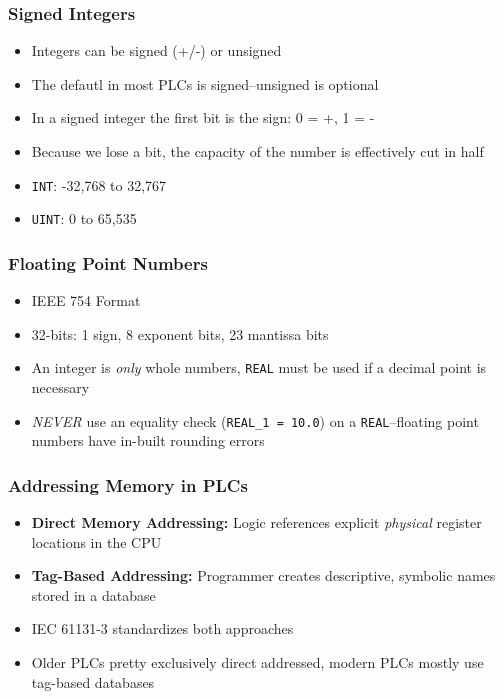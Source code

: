 \begin{frame}
    \frametitle{Signed Integers}
    
    \begin{itemize}
        \item Integers can be signed (+/-) or unsigned
        \item The defautl in most PLCs is signed--unsigned is optional
        \item In a signed integer the first bit is the sign: 0 = +, 1 = -
        \item Because we lose a bit, the capacity of the number is effectively cut in half
        \item \texttt{INT}: -32,768 to 32,767
        \item \texttt{UINT}: 0 to 65,535
    \end{itemize}
\end{frame}

\begin{frame}
    \frametitle{Floating Point Numbers}
    
    \begin{itemize}
        \item IEEE 754 Format
        \item 32-bits: 1 sign, 8 exponent bits, 23 mantissa bits
        \item An integer is \emph{only} whole numbers, \texttt{REAL} must be used if a decimal point is necessary
        \item \emph{NEVER} use an equality check (\texttt{REAL\_1 = 10.0}) on a \texttt{REAL}--floating point numbers have in-built rounding errors
    \end{itemize}
\end{frame}

\begin{frame}
    \frametitle{Addressing Memory in PLCs}

    \begin{itemize}
        \item \textbf{Direct Memory Addressing:} Logic references explicit \emph{physical} register locations in the CPU
        \item \textbf{Tag-Based Addressing:} Programmer creates descriptive, symbolic names stored in a database
        \item IEC 61131-3 standardizes both approaches
        \item Older PLCs pretty exclusively direct addressed, modern PLCs mostly use tag-based databases
    \end{itemize}
\end{frame}

